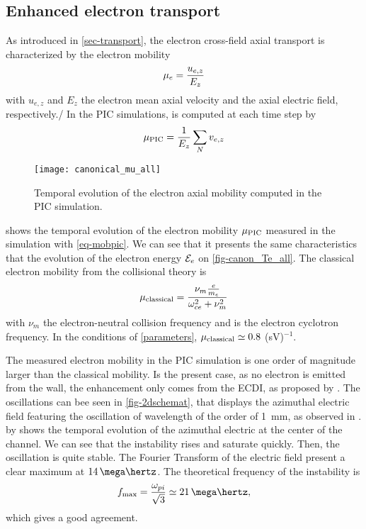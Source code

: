   \subsection{Enhanced electron transport} \label{subsec-canonmue}
  As introduced in \vref{sec-transport}, the electron cross-field axial transport is characterized by the electron mobility
  \begin{equation} \label{eq-mobdef}
    \mu_e = \frac{u_{e, z}}{E_z}
  \end{equation}
  with $u_{e,z}$ and $E_z$ the electron mean axial velocity and the axial electric field, respectively./
  In the \ac{PIC} simulations, \mob is computed at each time step by
  \begin{equation} \label{eq-mobpic}
    \mu_{\mathrm{PIC}} = \frac{1}{E_z} \sum_N v_{e,z}
  \end{equation}

  \begin{figure}[hbtp]
    \centering
    \texttt{[image: canonical\_mu\_all]}
    \caption{Temporal evolution of the electron axial mobility computed in the \ac{PIC} simulation.}
    \label{fig-canon_mu}
  \end{figure}
  
   shows the temporal evolution of the electron mobility $\mu_{\mathrm{PIC}}$ measured in the simulation with \cref{eq-mobpic}.
  We can see that it presents the same characteristics that the evolution of the electron energy ${\mathcal{E}_e}$ on \cref{fig-canon_Te_all}.
  The classical electron mobility from the collisional theory is \citep{lafleur2016a}
  \begin{equation} \label{eq-muclass}
    \mu_{\mathrm{classical}} = \frac{\nu_m \frac{e}{m_e}}{\omega_{ce}^2 + \nu_m^2}
  \end{equation}
  with $\nu_m$ the electron-neutral  collision frequency and \oce is the electron cyclotron frequency.
  In the conditions of \cref{parameters}, $\mu_{\mathrm{classical}} \simeq 0.8$ \square\meter(sV)$^{-1}$.
  
  The measured electron mobility in the \ac{PIC} simulation is one order of magnitude larger than the classical mobility.
  Is the present case, as no electron is emitted from the wall, the enhancement only comes from the \ac{ECDI}, as proposed by \citet{lafleur2016} .
  The oscillations can bee seen in \vref{fig-2dschemat}, that displays the azimuthal electric field featuring the oscillation of wavelength of the order of 1~mm, as observed in \citet{heron2013,janhunen2018}.
   by shows the temporal evolution of the azimuthal electric at the center of the channel.
  We can see that the instability rises and saturate quickly.
  Then, the oscillation is quite stable.
  The Fourier Transform of the electric field present a clear maximum at $14\,\mega\hertz$.
  The theoretical frequency of the instability is \citep{lafleur2017}
  \begin{equation} \label{eq-maxfeq}
    f_{\rm max} = \frac{\omega_{pi}}{\sqrt{3}} \simeq 21 \,\mega\hertz,
  \end{equation}
  which gives a good agreement.
  
